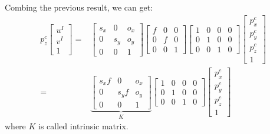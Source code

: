 \documentclass[
]{book}
\theoremstyle{definition}
\theoremstyle{definition}
\theoremstyle{definition}
\theoremstyle{definition}
\theoremstyle{remark}
\begin{document}
Combing the previous result, we can get:
\begin{align} p_z^c\begin{bmatrix} u^I\\v^I\\1 \end{bmatrix} =& \begin{bmatrix} s_x &0 &o_x \\ 0 &s_y &o_y\\ 0 &0 &1\end{bmatrix} \begin{bmatrix} f &0 &0 \\ 0 &f &0\\ 0 &0 &1\end{bmatrix} \begin{bmatrix} 1 &0 &0 &0 \\ 0 &1 &0 &0\\ 0 &0 &1 &0\end{bmatrix} \begin{bmatrix} p_x^c\\p_y^c\\p_z^c\\1 \end{bmatrix} \\
=&  \underbrace{\begin{bmatrix} s_xf &0 &o_x \\ 0 &s_yf &o_y\\ 0 &0 &1\end{bmatrix}}_{K} \begin{bmatrix} 1 &0 &0 &0 \\ 0 &1 &0 &0\\ 0 &0 &1 &0\end{bmatrix} \begin{bmatrix} p_x^c\\p_y^c\\p_z^c\\1 \end{bmatrix}\end{align}
where \(K\) is called intrinsic matrix.
\end{document}
